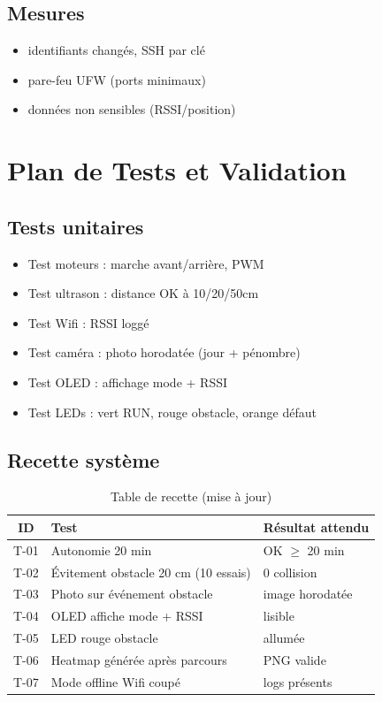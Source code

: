 \documentclass[a4paper,12pt]{report}
\begin{document}
\section{Mesures}
\begin{itemize}
    \item identifiants changés, SSH par clé
    \item pare-feu UFW (ports minimaux)
    \item données non sensibles (RSSI/position)
\end{itemize}

\chapter{Plan de Tests et Validation}

\section{Tests unitaires}
\begin{itemize}
    \item Test moteurs : marche avant/arrière, PWM
    \item Test ultrason : distance OK à 10/20/50cm
    \item Test Wifi : RSSI loggé
    \item Test caméra : photo horodatée (jour + pénombre)
    \item Test OLED : affichage mode + RSSI
    \item Test LEDs : vert RUN, rouge obstacle, orange défaut
\end{itemize}

\section{Recette système}
\begin{table}[H]
\centering
{}
\begin{tabular}{|c|p{7cm}|p{4cm}|}
\hline
\rowcolor{UTSlate}\color{white}\textbf{ID} & \color{white}\textbf{Test} & \color{white}\textbf{Résultat attendu} \\ \hline
T-01 & Autonomie 20 min & OK \(\geq\) 20 min \\ \hline
T-02 & Évitement obstacle 20 cm (10 essais) & 0 collision \\ \hline
T-03 & Photo sur événement obstacle & image horodatée \\ \hline
T-04 & OLED affiche mode + RSSI & lisible \\ \hline
T-05 & LED rouge obstacle & allumée \\ \hline
T-06 & Heatmap générée après parcours & PNG valide \\ \hline
T-07 & Mode offline Wifi coupé & logs présents \\ \hline
\end{tabular}
\caption{Table de recette (mise à jour)}
\end{table}
\end{document}
